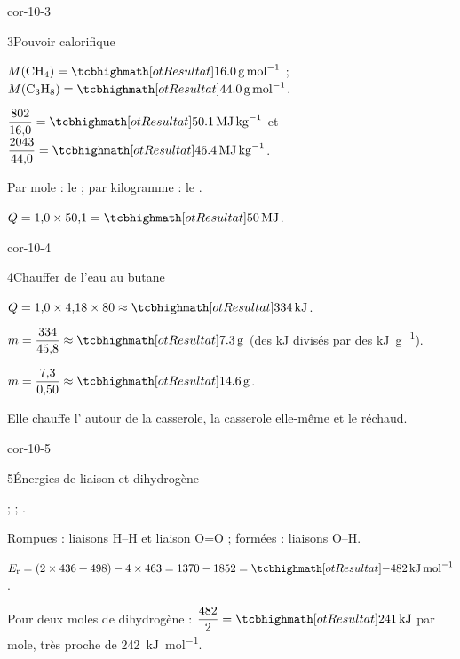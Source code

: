 \begin{blocLivre}{cor-10-3}
\begin{corrige}{3}{Pouvoir calorifique}
\begin{questions}
\item $M(\ce{CH4})=\res{\qty{16,0}{g.mol^{-1}}}$ ; $M(\ce{C3H8})=\res{\qty{44,0}{g.mol^{-1}}}$.
\item $\dfrac{802}{16{,}0}=\res{\qty{50,1}{MJ.kg^{-1}}}$ et $\dfrac{2043}{44{,}0}=\res{\qty{46,4}{MJ.kg^{-1}}}$.
\item Par mole : le  ; par kilogramme : le .
\item $Q=1{,}0\times50{,}1=\res{\qty{50}{MJ}}$.
\end{questions}
\end{corrige}
\end{blocLivre}
\begin{blocLivre}{cor-10-4}
\begin{corrige}{4}{Chauffer de l'eau au butane}
\begin{questions}
\item $Q=1{,}0\times4{,}18\times80\approx\res{\qty{334}{kJ}}$.
\item $m=\dfrac{334}{45{,}8}\approx\res{\qty{7,3}{g}}$ (des \unit{kJ} divisés par des \unit{kJ.g^{-1}}).
\item $m=\dfrac{7{,}3}{0{,}50}\approx\res{\qty{14,6}{g}}$.
\item Elle chauffe l' autour de la casserole, la casserole elle-même et le réchaud.
\end{questions}
\end{corrige}
\end{blocLivre}
\begin{blocLivre}{cor-10-5}
\begin{corrige}{5}{Énergies de liaison et dihydrogène}
\begin{questions}
\item {} ;  ; .
\item Rompues :  liaisons H--H et  liaison O=O ; formées :  liaisons O--H.
\item $E_\mathrm{r}=(2\times436+498)-4\times463=1370-1852=\res{\qty{-482}{kJ.mol^{-1}}}$.
\item Pour deux moles de dihydrogène : $\dfrac{482}{2}=\res{\qty{241}{kJ}}$ par mole, très proche de \qty{242}{kJ.mol^{-1}}.
\end{questions}
\end{corrige}
\end{blocLivre}
